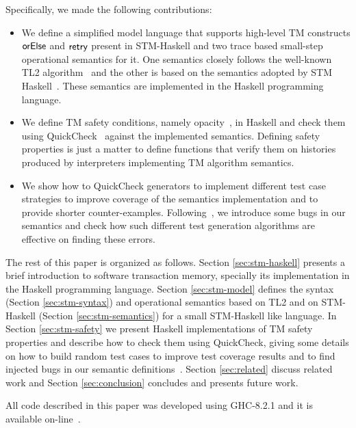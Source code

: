 \documentclass{fundam}
\newcommand{\F}[1]{\green{\mathsf{#1}}}
\begin{document}
Specifically, we made the following contributions:

\begin{itemize}
   \item We define a simplified model language that supports high-level TM constructs 
         \ensuremath{\F{orElse}} and \ensuremath{\F{retry}} present in STM-Haskell and two trace based small-step operational semantics for it.
         One semantics closely follows the well-known TL2 algorithm~\cite{Dice06} and the other is based on the
         semantics adopted by STM Haskell~\cite{Harris05}.
         These semantics are implemented in the Haskell programming language.
   \item We define TM safety conditions, namely opacity~\cite{Guerraoui2008,Doherty2009},
         in Haskell and check them using QuickCheck~\cite{Claessen00} against the implemented
         semantics. Defining safety properties is just a matter to define functions that verify them on
         histories produced by interpreters implementing TM algorithm semantics.
   \item We show how to QuickCheck generators to implement different test case strategies to improve coverage
         of the semantics implementation and to provide shorter counter-examples. Following~\cite{Hritcu2013}, we
         introduce some bugs in our semantics and check how such different test generation algorithms are
         effective on finding these errors.
\end{itemize}

The rest of this paper is organized as follows. Section \ref{sec:stm-haskell} presents a brief introduction
to software transaction memory, specially its implementation in the Haskell programming language. Section \ref{sec:stm-model}
defines the syntax (Section \ref{sec:stm-syntax}) and operational semantics
based on TL2 and on STM-Haskell (Section \ref{sec:stm-semantics}) for a small STM-Haskell like language.
In Section \ref{sec:stm-safety} we present Haskell implementations of TM safety properties and describe how to check them using
QuickCheck, giving some details on how to build random test cases to improve test coverage results and to find injected bugs in
our semantic definitions~\cite{Hritcu2013}.
Section \ref{sec:related} discuss related work and Section \ref{sec:conclusion} concludes and
presents future work.

All code described in this paper was developed using GHC-8.2.1 and it is available on-line~\cite{stm-rep}.
\end{document}
